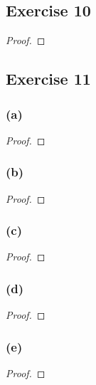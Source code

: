 \documentclass[14pt]{extarticle}
\begin{document}
\subsection{Exercise 10}

\begin{proof}

\end{proof}

\subsection{Exercise 11}

\subsubsection{(a)}

\begin{proof}

\end{proof}

\subsubsection{(b)}

\begin{proof}

\end{proof}

\subsubsection{(c)}

\begin{proof}

\end{proof}

\subsubsection{(d)}

\begin{proof}

\end{proof}

\subsubsection{(e)}

\begin{proof}

\end{proof}
\end{document}
